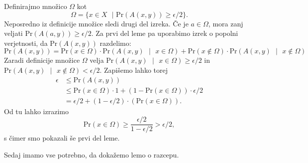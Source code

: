 \documentclass[isrm2, tisk]{fmfdelo}
\begin{document}
\begin{dokaz}
    Definirajmo množico $\Omega$ kot
    $$
    \Omega = \{x \in X \text{ }|\text{ Pr}(A(x, y)) \geq \epsilon / 2\}.
    $$
    Neposredno iz definicije množice sledi drugi del izreka. Če je $a \in \Omega$, mora zanj veljati
    $\text{Pr}(A(a, y)) \geq \epsilon / 2$. Za prvi del leme pa uporabimo izrek o popolni verjetnosti, 
    da $\text{Pr}(A(x, y))$ razdelimo:
    $$
    \text{Pr}(A(x, y)) = \text{Pr}(x \in \Omega) \cdot \text{Pr}(A(x, y) \text{ }|\text{ } x \in \Omega) + 
        \text{Pr}(x \notin \Omega) \cdot \text{Pr}(A(x, y) \text{ }|\text{ } x \notin \Omega)
    $$
    Zaradi definicije množice $\Omega$ velja $\text{Pr}(A(x, y) \text{ }|\text{ } x \in \Omega) 
    \geq \epsilon / 2$ in $\text{Pr}(A(x, y) \text{ }|\text{ } x \notin \Omega) < \epsilon / 2$.
    Zapišemo lahko torej
    \begin{align*}
        \epsilon &\leq \text{Pr}(A(x, y)) \\
                 &\leq \text{Pr}(x \in \Omega) \cdot 1 + (1 - \text{Pr}(x \in \Omega)) \cdot \epsilon / 2 \\
                 &= \epsilon / 2 + (1 - \epsilon / 2) \cdot (\text{Pr}(x \in \Omega)).
    \end{align*}
    Od tu lahko izrazimo
    $$
    \text{Pr}(x \in \Omega) \geq \frac{\epsilon / 2}{1 - \epsilon / 2} > \epsilon / 2,
    $$
    s čimer smo pokazali še prvi del leme.
\end{dokaz}

Sedaj imamo vse potrebno, da dokažemo lemo o razcepu.
\end{document}
